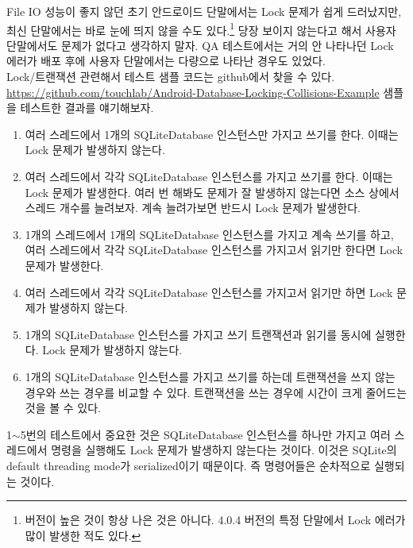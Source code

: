 File IO 성능이 좋지 않던 초기 안드로이드 단말에서는 Lock 문제가 쉽게 드러났지만, 최신 단말에서는 바로 눈에 띄지 않을 수도 있다.\footnote{버전이 높은 것이 항상 나은 것은 아니다. 4.0.4 버전의 특정 단말에서 Lock 에러가 많이 발생한 적도 있다.} 당장 보이지 않는다고 해서 사용자 단말에서도 문제가 없다고 생각하지 말자. QA 테스트에서는 거의 안 나타나던 Lock 에러가 배포 후에 사용자 단말에서는 다량으로 나타난 경우도 있었다.\\

Lock/트랜잭션 관련해서 테스트 샘플 코드는 github에서 찾을 수 있다.
\url{https://github.com/touchlab/Android-Database-Locking-Collisions-Example}
샘플을 테스트한 결과를 얘기해보자.
\begin{enumerate}
\item 여러 스레드에서 1개의 SQLiteDatabase 인스턴스만 가지고 쓰기를 한다. 이때는 Lock 문제가 발생하지 않는다. 

\item 여러 스레드에서 각각 SQLiteDatabase 인스턴스를 가지고 쓰기를 한다. 이때는 Lock 문제가 발생한다. 
여러 번 해봐도 문제가 잘 발생하지 않는다면 소스 상에서 스레드 개수를 늘려보자. 계속 늘려가보면 반드시 Lock 문제가 발생한다.

\item 1개의 스레드에서 1개의 SQLiteDatabase 인스턴스를 가지고 계속 쓰기를 하고, 여러 스레드에서 각각 SQLiteDatabase 인스턴스를 가지고서 읽기만 한다면 Lock 문제가 발생한다.

\item 여러 스레드에서 각각 SQLiteDatabase 인스턴스를 가지고서 읽기만 하면 Lock 문제가 발생하지 않는다.

\item 1개의 SQLiteDatabase 인스턴스를 가지고 쓰기 트랜잭션과 읽기를 동시에 실행한다. Lock 문제가 발생하지 않는다.

\item 1개의 SQLiteDatabase 인스턴스를 가지고 쓰기를 하는데 트랜잭션을 쓰지 않는 경우와 쓰는 경우를 비교할 수 있다. 트랜잭션을 쓰는 경우에 시간이 크게 줄어드는 것을 볼 수 있다.

\end{enumerate}

1$\sim$5번의 테스트에서 중요한 것은  SQLiteDatabase 인스턴스를 하나만 가지고 여러 스레드에서 명령을 실행해도 Lock 문제가 발생하지 않는다는 것이다. 이것은 SQLite의 default threading mode가 serialized이기 때문이다. 즉 명령어들은 순차적으로 실행되는 것이다.

